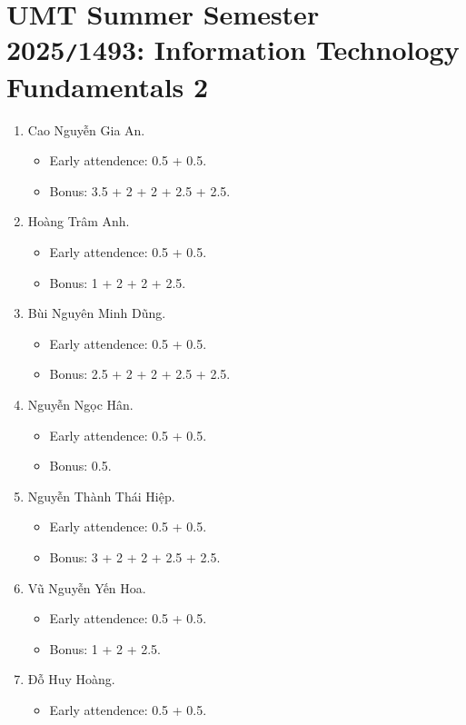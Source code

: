 \documentclass{article}
\begin{document}

\section{UMT Summer Semester 2025{\tt/}1493: Information Technology Fundamentals 2}

\begin{enumerate}
	\item {\sc Cao Nguyễn Gia An.}
	\begin{itemize}
		\item Early attendence: 0.5 + 0.5.
		\item Bonus: 3.5 + 2 + 2 + 2.5 + 2.5.
	\end{itemize}
	\item {\sc Hoàng Trâm Anh.}
	\begin{itemize}
		\item Early attendence: 0.5 + 0.5.
		\item Bonus: 1 + 2 + 2 + 2.5.
	\end{itemize}
	\item {\sc Bùi Nguyên Minh Dũng.}
	\begin{itemize}
		\item Early attendence: 0.5 + 0.5.
		\item Bonus: 2.5 + 2 + 2 + 2.5 + 2.5.
	\end{itemize}
	\item {\sc Nguyễn Ngọc Hân.}
	\begin{itemize}
		\item Early attendence: 0.5 + 0.5.
		\item Bonus: 0.5.
	\end{itemize}
	\item {\sc Nguyễn Thành Thái Hiệp.}
	\begin{itemize}
		\item Early attendence: 0.5 + 0.5.
		\item Bonus: 3 + 2 + 2 + 2.5 + 2.5.
	\end{itemize}
	\item {\sc Vũ Nguyễn Yến Hoa.}
	\begin{itemize}
		\item Early attendence: 0.5 + 0.5.
		\item Bonus: 1 + 2 + 2.5.
	\end{itemize}
	\item {\sc Đỗ Huy Hoàng.}
	\begin{itemize}
		\item Early attendence: 0.5 + 0.5.

\end{itemize}
\end{enumerate}
\end{document}

